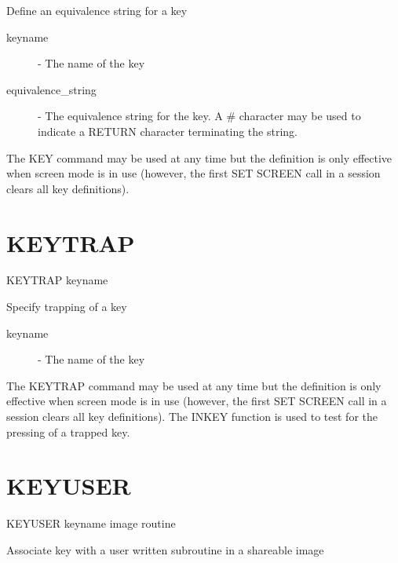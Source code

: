 \documentclass[twoside,11pt]{report}
\newcommand{\xlabel}[1]{}
\begin{document}
 Define an equivalence string for a key

\begin{description}

\item[keyname] -  The name of the key 

\item[equivalence\_string]  -  The equivalence string for the key. A \#
              character may be used to indicate a RETURN character
              terminating the string.

\end{description}
                                     
The KEY command may be used at any time but the definition is only
effective when screen mode is in use (however, the first SET SCREEN call
in a session clears all key definitions).

\section{\xlabel{KEYTRAP}KEYTRAP\label{KEYTRAP}}

    KEYTRAP  \hspace{.5cm} keyname 
         
 Specify trapping of a key

\begin{description}

\item[keyname] -  The name of the key 

\end{description}
                                     
The KEYTRAP command may be used at any time but the definition is only
effective when screen mode is in use (however, the first SET SCREEN call
in a session clears all key definitions). The INKEY function is used to test
for the pressing of a trapped key.

\section{\xlabel{KEYUSER}KEYUSER\label{KEYUSER}}

    KEYUSER  \hspace{.5cm} keyname  \hspace{.5cm} image \hspace{.5cm} routine
         
 Associate key with a user written subroutine in a shareable image
\end{document}
